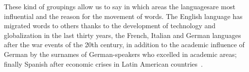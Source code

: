 \documentclass[10pt,letterpaper]{article} %
\begin{document}
	
	These kind of groupings allow us to say in which areas the languages ​​are most influential and the reason for the movement of words. The English language has migrated words to others thanks to the development of technology and globalization in the last thirty years, the French, Italian and German languages ​​after the war events of the 20th century, in addition to the academic influence of German by the surnames of German-speakers who excelled in academic areas; finally Spanish after economic crises in Latin American countries~.
	
	
	
	
	
	
\end{document}
